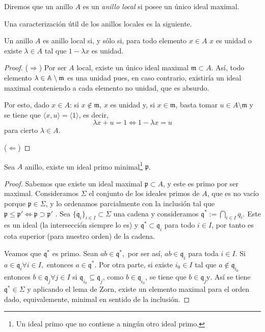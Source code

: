 \documentclass[./main.tex]{subfiles}
\begin{document}
	\begin{definition}
		Diremos que un anillo $A$ es un \textit{anillo local} si posee un único ideal maximal.
	\end{definition}
	
	Una caracterización útil de los anillos locales es la siguiente.
	\begin{proposition}
		Un anillo $A$ es anillo local si, y sólo si, para todo elemento $x\in A$ $x$ es unidad o existe $\lambda\in A$ tal que $1-\lambda x$ es unidad.
	\end{proposition}
	\begin{proof}
		($\Rightarrow$) Por ser $A$ local, existe un único ideal maximal $\mathfrak m\subset A$. Así, todo elemento $\lambda\in\mathbb{A}\setminus\mathfrak m$ es una unidad pues, en caso contrario, existiría un ideal maximal conteniendo a cada elemento no unidad, que es absurdo.
		
		Por esto, dado $x\in A$: si $x\notin \mathfrak m$, $x$ es unidad y, si $x\in \mathfrak m$, basta tomar $u\in A\setminus\mathfrak m$ y se tiene que $\langle x,u\rangle=\langle 1\rangle$, es decir,
		$$\lambda x+u=1\Longleftrightarrow 1-\lambda x=u$$
		para cierto $\lambda\in A$.
		
		($\Leftarrow$) 
	\end{proof}
	
	\begin{proposition}
		Sea $A$ anillo, existe un ideal primo minimal\footnote{Un ideal primo que no contiene a ningún otro ideal primo.} $\mathfrak p$.
	\end{proposition}
	\begin{proof}
		Sabemos que existe un ideal maximal $\mathfrak{p} \subset A$, y este es primo por ser maximal. Consideramos $\Sigma$ el conjunto de los ideales primos de $A$, que es no vacío porque $\mathfrak p \in \Sigma$, y lo ordenamos parcialmente con la inclusión tal que $\mathfrak p \leq \mathfrak p' \iff \mathfrak p \supset \mathfrak p'$ . Sea $\{\mathfrak{q}_{i}\}_{i \in I} \subset \Sigma$ una cadena y consideramos $\mathfrak{q}^{*}:=\bigcap_{i \in I} q_{i}$. Este es un ideal (la intersección siempre lo es) y $\mathfrak{q}^{*} \subset \mathfrak{q}_{i}$ para todo $i\in I$, por tanto es cota superior (para nuestro orden) de la cadena.
		
		Veamos que $\mathfrak{q}^{*}$ es primo. Sean $a b \in \mathfrak{q}^{*},$ por ser así, $a b \in \mathfrak{q}_{i}$ para toda $i \in I .$ Si $a \in \mathfrak{q}_{i} \forall i \in I,$ entonces $a \in \mathfrak{q}^{*}$. Por otra parte, si existe $i_{0} \in I$ tal que $a \notin \mathfrak{q}_{i_{0}}$
		entonces $b \in \mathfrak{q}_{j} \forall j \in I$ si $\mathfrak{q}_{i_{0}} \subseteq \mathfrak{q}_{j}$, como $b \in \mathfrak{q}_{i_{0}}$, se tiene que $b \in \mathfrak{q}_{j} \mathrm{y}$. Así se tiene $\mathfrak q^* \in \Sigma$
		y aplicando el lema de Zorn, existe un elemento maximal para el orden dado, equivalemente, minimal en sentido de la inclusión.
	\end{proof}
	
\end{document}
